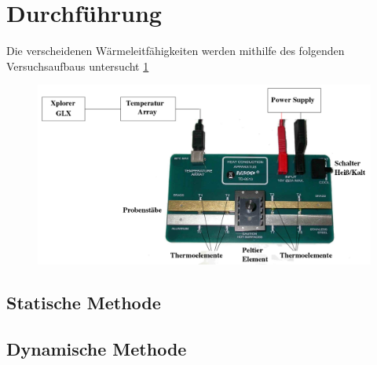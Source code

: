 \section{Durchführung}
\label{sec:Durchführung}
Die verscheidenen Wärmeleitfähigkeiten werden mithilfe des folgenden Versuchsaufbaus 
untersucht \ref{fig:aufbau}
\begin{figure}
\centering
\includegraphics{content/aufbau.png}
\label{fig:aufbau}
\end{figure}

\subsection{Statische Methode}
\label{sec:statische Methode}


\subsection{Dynamische Methode}
\label{sec:dynamische Methode}


